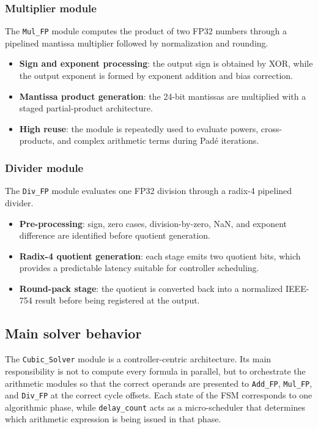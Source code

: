 \subsubsection{Multiplier module}
The \texttt{Mul\_FP} module computes the product of two FP32 numbers through a pipelined mantissa multiplier followed by normalization and rounding.
\begin{itemize}[noitemsep]
    \item \textbf{Sign and exponent processing}: the output sign is obtained by XOR, while the output exponent is formed by exponent addition and bias correction.
    \item \textbf{Mantissa product generation}: the 24-bit mantissas are multiplied with a staged partial-product architecture.
    \item \textbf{High reuse}: the module is repeatedly used to evaluate powers, cross-products, and complex arithmetic terms during Pad\'e iterations.
\end{itemize}

\subsubsection{Divider module}
The \texttt{Div\_FP} module evaluates one FP32 division through a radix-4 pipelined divider.
\begin{itemize}[noitemsep]
    \item \textbf{Pre-processing}: sign, zero cases, division-by-zero, NaN, and exponent difference are identified before quotient generation.
    \item \textbf{Radix-4 quotient generation}: each stage emits two quotient bits, which provides a predictable latency suitable for controller scheduling.
    \item \textbf{Round-pack stage}: the quotient is converted back into a normalized IEEE-754 result before being registered at the output.
\end{itemize}

\subsection{Main solver behavior}

The \texttt{Cubic\_Solver} module is a controller-centric architecture. Its main responsibility is not to compute every formula in parallel, but to orchestrate the arithmetic modules so that the correct operands are presented to \texttt{Add\_FP}, \texttt{Mul\_FP}, and \texttt{Div\_FP} at the correct cycle offsets. Each state of the FSM corresponds to one algorithmic phase, while \texttt{delay\_count} acts as a micro-scheduler that determines which arithmetic expression is being issued in that phase.

